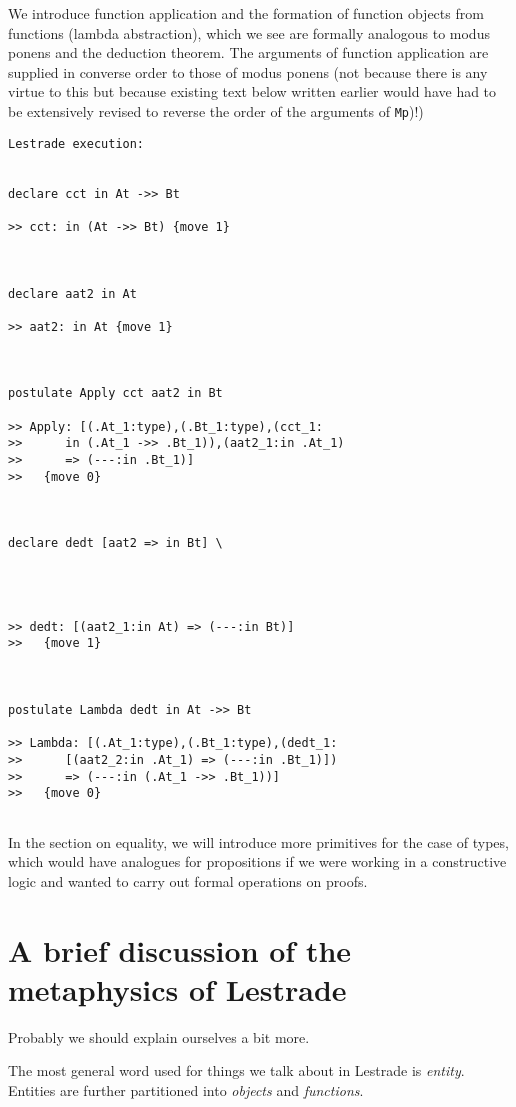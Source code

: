 \documentclass[12pt]{article}
\begin{document}
We introduce function application and the formation of function objects from functions (lambda abstraction), which we see are formally analogous to modus ponens and the deduction theorem.  The arguments of function application are supplied in converse order to those of modus ponens (not because there is any virtue to this but because existing text below written earlier would have had to be extensively revised to reverse the order of the arguments of {\tt Mp})!)

\begin{verbatim}Lestrade execution:


declare cct in At ->> Bt

>> cct: in (At ->> Bt) {move 1}



declare aat2 in At

>> aat2: in At {move 1}



postulate Apply cct aat2 in Bt

>> Apply: [(.At_1:type),(.Bt_1:type),(cct_1:
>>      in (.At_1 ->> .Bt_1)),(aat2_1:in .At_1)
>>      => (---:in .Bt_1)]
>>   {move 0}



declare dedt [aat2 => in Bt] \
   



>> dedt: [(aat2_1:in At) => (---:in Bt)]
>>   {move 1}



postulate Lambda dedt in At ->> Bt

>> Lambda: [(.At_1:type),(.Bt_1:type),(dedt_1:
>>      [(aat2_2:in .At_1) => (---:in .Bt_1)])
>>      => (---:in (.At_1 ->> .Bt_1))]
>>   {move 0}


\end{verbatim}

In the section on equality, we will introduce more primitives for the case of types, which would have analogues for propositions if we were working in a constructive logic and wanted to carry out formal operations on proofs.

\newpage

\section{A brief discussion of the metaphysics of Lestrade}

Probably we should explain ourselves a bit more.

The most general word used for things we talk about in Lestrade is {\em entity\/}.  Entities are further partitioned into {\em objects} and {\em functions}.
\end{document}
